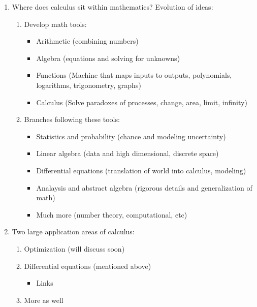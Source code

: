 \documentclass{article}
\begin{document}
\begin{enumerate}
\item Where does calculus sit within mathematics? Evolution of ideas:
\begin{enumerate}
\item Develop math tools:
\begin{itemize}
\item Arithmetic (combining numbers)
\item Algebra (equations and solving for unknowns)
\item Functions (Machine that maps inputs to outputs, polynomials, logarithms, trigonometry, graphs)
\item Calculus (Solve paradoxes of processes, change, area, limit, infinity)
\end{itemize}
\item Branches following these tools:
\begin{itemize}
\item Statistics and probability (chance and modeling uncertainty)
\item Linear algebra (data and high dimensional, discrete space)
\item Differential equations (translation of world into calculus, modeling)
\item Analaysis and abstract algebra (rigorous details and generalization of math)
\item Much more (number theory, computational, etc)
\end{itemize}
\end{enumerate}

\item Two large application areas of calculus:
\begin{enumerate}
\item Optimization (will discuss soon)
\item Differential equations (mentioned above)
\begin{itemize}
\item Links
\end{itemize}
\item More as well
\end{enumerate}


\end{enumerate}
\end{document}
